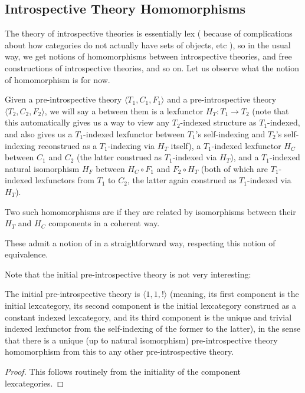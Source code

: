 \subsection{Introspective Theory Homomorphisms}
The theory of introspective theories is essentially lex ( because of complications about how categories do not actually have sets of objects, etc \TODO), so in the usual way, we get notions of homomorphisms between introspective theories, and free constructions of introspective theories, and so on. Let us observe what the notion of homomorphism is for now.

\begin{definition}\label{PreIntrospHomo}
Given a pre-introspective theory $\langle T_1, C_1, F_1 \rangle$ and a pre-introspective theory $\langle T_2, C_2, F_2 \rangle$, we will say a  between them is a lexfunctor $H_T : T_1 \to T_2$ (note that this automatically gives us a way to view any $T_2$-indexed structure as $T_1$-indexed, and also gives us a $T_1$-indexed lexfunctor between $T_1$'s self-indexing and $T_2$'s self-indexing reconstrued as a $T_1$-indexing via $H_T$ itself), a $T_1$-indexed lexfunctor $H_C$ between $C_1$ and $C_2$ (the latter construed as $T_1$-indexed via $H_T$), and a $T_1$-indexed natural isomorphism $H_F$ between $H_C \circ F_1$ and $F_2 \circ H_T$ (both of which are $T_1$-indexed lexfunctors from $T_1$ to $C_2$, the latter again construed as $T_1$-indexed via $H_T$).  

Two such homomorphisms are  if they are related by isomorphisms between their $H_T$ and $H_C$ components in a coherent way. \TODO

These admit a notion of  in a straightforward way, respecting this notion of equivalence. \TODO
\end{definition}

Note that the initial pre-introspective theory is not very interesting:

\begin{theorem}
The initial pre-introspective theory is $\langle 1, 1, !\rangle$ (meaning, its first component is the initial lexcategory, its second component is the initial lexcategory construed as a constant indexed lexcategory, and its third component is the unique and trivial indexed lexfunctor from the self-indexing of the former to the latter), in the sense that there is a unique (up to natural isomorphism) pre-introspective theory homomorphism from this to any other pre-introspective theory.
\end{theorem}
\begin{proof}
This follows routinely from the initiality of the component lexcategories.
\end{proof}

